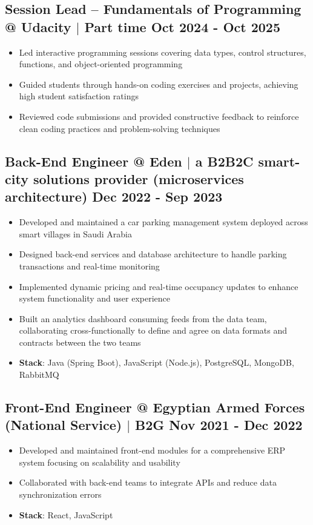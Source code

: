 \documentclass[a4paper,10pt]{article}
\newenvironment{zitemize}{
\begin{itemize}\itemsep0pt \parskip0pt \parsep1pt}
{\end{itemize}\vspace{-0.5cm}}
\begin{document}
\subsection*{Session Lead – Fundamentals of Programming @ Udacity $|$ Part time \hfill Oct 2024 - Oct 2025}
    \begin{zitemize}
        \item Led interactive programming sessions covering data types, control structures, functions, and object-oriented programming
        \item Guided students through hands-on coding exercises and projects, achieving high student satisfaction ratings
        \item Reviewed code submissions and provided constructive feedback to reinforce clean coding practices and problem-solving techniques
    \end{zitemize}

\subsection*{Back-End Engineer @ Eden $|$ a B2B2C smart-city solutions provider (microservices architecture) \hfill Dec 2022 - Sep 2023}
    \begin{zitemize}
        \item Developed and maintained a car parking management system deployed across smart villages in Saudi Arabia
        \item Designed back-end services and database architecture to handle parking transactions and real-time monitoring
        \item Implemented dynamic pricing and real-time occupancy updates to enhance system functionality and user experience
        \item Built an analytics dashboard consuming feeds from the data team, collaborating cross-functionally to define and agree on data formats and contracts between the two teams
        \item \textbf{Stack}: Java (Spring Boot), JavaScript (Node.js), PostgreSQL, MongoDB, RabbitMQ
    \end{zitemize}

\subsection*{Front-End Engineer @ Egyptian Armed Forces (National Service) $|$ B2G \hfill Nov 2021 - Dec 2022}
    \begin{zitemize}
        \item Developed and maintained front-end modules for a comprehensive ERP system focusing on scalability and usability
        \item Collaborated with back-end teams to integrate APIs and reduce data synchronization errors
        \item \textbf{Stack}: React, JavaScript
    \end{zitemize}
\end{document}
